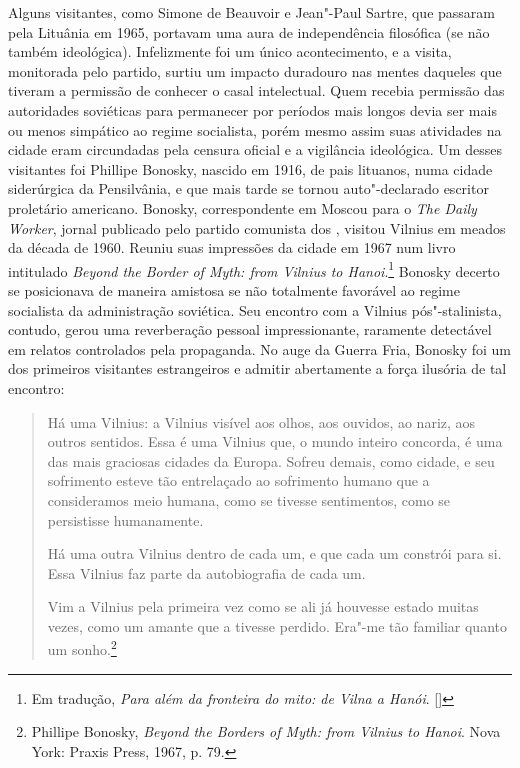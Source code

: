 Alguns visitantes, como Simone de Beauvoir e Jean"-Paul Sartre, que passaram
pela Lituânia em 1965, portavam uma aura de independência filosófica (se
não também ideológica). Infelizmente foi um único acontecimento, e a
visita, monitorada pelo partido, surtiu um impacto duradouro nas mentes
daqueles que tiveram a permissão de conhecer o casal intelectual. Quem
recebia permissão das autoridades soviéticas para permanecer por
períodos mais longos devia ser mais ou menos simpático ao regime
socialista, porém mesmo assim suas atividades na cidade eram circundadas
pela censura oficial e a vigilância ideológica. Um desses visitantes foi
Phillipe Bonosky, nascido em 1916, de pais lituanos, numa cidade
siderúrgica da Pensilvânia, e que mais tarde se tornou auto"-declarado
escritor proletário americano. Bonosky, correspondente em Moscou para o
\textit{The Daily Worker}, jornal publicado pelo partido comunista dos
, visitou Vilnius em meados da década de 1960. Reuniu suas impressões
da cidade em 1967 num livro intitulado \textit{Beyond the Border of Myth:
from Vilnius to Hanoi}.\footnote{Em tradução, \textit{Para além da fronteira do mito: de Vilna a Hanói}. []} Bonosky decerto se posicionava de maneira amistosa se não totalmente favorável ao regime socialista da administração
soviética. Seu encontro com a Vilnius pós"-stalinista, contudo, gerou uma
reverberação pessoal impressionante, raramente detectável em relatos
controlados pela propaganda. No auge da Guerra Fria, Bonosky foi um dos
primeiros visitantes estrangeiros e admitir abertamente a força ilusória
de tal encontro:

\begin{quote}
Há uma Vilnius: a Vilnius visível aos olhos, aos ouvidos, ao nariz, aos
outros sentidos. Essa é uma Vilnius que, o mundo inteiro concorda, é uma
das mais graciosas cidades da Europa. Sofreu demais, como cidade, e seu
sofrimento esteve tão entrelaçado ao sofrimento humano que a
consideramos meio humana, como se tivesse sentimentos, como se
persistisse humanamente.

Há uma outra Vilnius dentro de cada um, e que cada um constrói para si.
Essa Vilnius faz parte da autobiografia de cada um.

Vim a Vilnius pela primeira vez como se ali já houvesse estado muitas
vezes, como um amante que a tivesse perdido. Era"-me tão familiar quanto
um sonho.\footnote{Phillipe Bonosky, \textit{Beyond the Borders of Myth: from Vilnius to Hanoi}. Nova York: Praxis Press, 1967, p. 79.} \end{quote}

